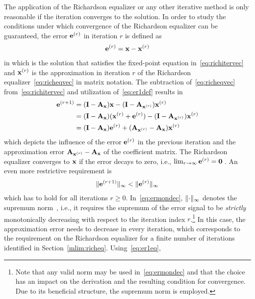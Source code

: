 \documentclass[10pt,twocolumn,twoside]{IEEEtran}
\begin{document}
The application of the Richardson equalizer or any
other iterative method is only reasonable if the iteration converges to the
solution. In order to study the conditions under which convergence of the
Richardson equalizer can be guaranteed, the error $\bm{\mathrm{e}}^{(r)}$ in
iteration $r$ is defined as
\begin{align}
	\bm{\mathrm{e}}^{(r)} = \bm{\mathrm{x}} - \bm{\mathrm{x}}^{(r)}
	\label{eq:er1def}
\end{align}
in which  is the solution that satisfies the fixed-point equation
in~\eqref{eq:richitervec} and $\bm{\mathrm{x}}^{(r)}$ is the approximation in
iteration $r$ of the Richardson equalizer~\eqref{eq:richeqvec} in matrix notation.
The subtraction of~\eqref{eq:richeqvec} from~\eqref{eq:richitervec} and
utilization of~\eqref{eq:er1def} results in
\begin{align}
	\bm{\mathrm{e}}^{(r+1)}
		&= (\bm{\mathrm{I}}-\bm{\mathrm{A}}_{\bm{\mathrm{x}}})\bm{\mathrm{x}} - (\bm{\mathrm{I}}-\bm{\mathrm{A}}_{\bm{\mathrm{x}}^{(r)}})\bm{\mathrm{x}}^{(r)} \notag\\
		&= (\bm{\mathrm{I}}-\bm{\mathrm{A}}_{\bm{\mathrm{x}}})(\bm{\mathrm{x}}^{(r)}+\bm{\mathrm{e}}^{(r)})
				- (\bm{\mathrm{I}}-\bm{\mathrm{A}}_{\bm{\mathrm{x}}^{(r)}})\bm{\mathrm{x}}^{(r)} \notag\\
		&= (\bm{\mathrm{I}} - \bm{\mathrm{A}}_{\bm{\mathrm{x}}})\bm{\mathrm{e}}^{(r)}
				+ (\bm{\mathrm{A}}_{\bm{\mathrm{x}}^{(r)}} - \bm{\mathrm{A}}_{\bm{\mathrm{x}}})\bm{\mathrm{x}}^{(r)}
	\label{eq:er1eq}
\end{align}
which depicts the influence of the error $\bm{\mathrm{e}}^{(r)}$ in the previous
iteration and the approximation error $\bm{\mathrm{A}}_{\bm{\mathrm{x}}^{(r)}} - \bm{\mathrm{A}}_{\bm{\mathrm{x}}}$
of the coefficient matrix. The Richardson equalizer converges to $\bm{\mathrm{x}}$ if
the error decays to zero, i.e., $\lim_{r\rightarrow\infty} \bm{\mathrm{e}}^{(r)} = \bm{\mathrm{0}}\:$.
An even more restrictive requirement is
\begin{align}
	\lVert\bm{\mathrm{e}}^{(r+1)}\rVert_\infty < \lVert\bm{\mathrm{e}}^{(r)}\rVert_\infty
	\label{eq:ermondec}
\end{align}
which has to hold for all iterations $r\geq 0$.
In~\eqref{eq:ermondec}, $\lVert\cdot\rVert_\infty$ denotes the supremum norm~\cite{rudin1964}, i.e.,
it requires the supremum of the error signal to be \emph{strictly} monotonically
decreasing with respect to the iteration index $r$.\footnote{Note
that any valid norm may be used in~\eqref{eq:ermondec} and that the choice has an impact on the derivation
and the resulting condition for convergence. Due to its beneficial structure,
the supremum norm is employed.} In this case,
the approximation error needs to decrease in every iteration, which corresponds to
the requirement on the Richardson equalizer for a finite number of iterations
identified in Section~\ref{mlim:richeq}. Using~\eqref{eq:er1eq},
\end{document}

